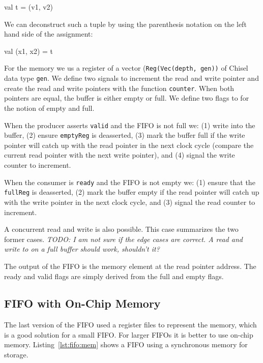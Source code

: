 \documentclass[%
    10pt,
    headinclude, footexclude,
    openright, %
    notitlepage,
    cleardoubleempty,
    headsepline,
    pointlessnumbers,
    bibtotoc, idxtotoc,
    ]{scrbook}
\newcommand{\code}[1]{{\lstinline[basicstyle=\small\ttfamily]{#1}}}
\newcommand{\todo}[1]{{\emph{TODO: #1}}}
\begin{document}
\begin{chisel}
  val t = (v1, v2)
\end{chisel}

\noindent We can deconstruct such a tuple by using the parenthesis notation
on the left hand side of the assignment:

\begin{chisel}
val (x1, x2) = t
\end{chisel}

For the memory we us a register of a vector (\code{Reg(Vec(depth, gen))} of
Chisel data type \code{gen}. We define two signals to increment the read and
write pointer and create the read and write pointers with the function \code{counter}.
When both pointers are equal, the buffer is either empty or full.
We define two flags to for the notion of empty and full.

When the producer asserts \code{valid} and the FIFO is not full we:
(1) write into the buffer, (2) ensure \code{emptyReg} is deasserted,
(3) mark the buffer full if the write pointer will catch up with the read pointer
in the next clock cycle (compare the current read pointer with the next
write pointer), and (4) signal the write counter to increment.

When the consumer is \code{ready} and the FIFO is not empty we:
(1) ensure that the \code{fullReg} is deasserted, (2) mark the buffer
empty if the read pointer will catch up with the write pointer in
the next clock cycle, and (3) signal the read counter to increment.

A concurrent read and write is also possible. This case summarizes
the two former cases. \todo{I am not sure if the edge cases are correct.
A read and write to on a full buffer should work, shouldn't it?}

The output of the FIFO is the memory element at the read pointer address.
The ready and valid flags are simply derived from the full and empty
flags.

\subsection{FIFO with On-Chip Memory}

The last version of the FIFO used a register files to represent the memory,
which is a good solution for a small FIFO. For larger FIFOs it is better to
use on-chip memory.
Listing~\ref{lst:fifo:mem} shows a FIFO using a synchronous memory for
storage.

\newpage
{}
\end{document}
